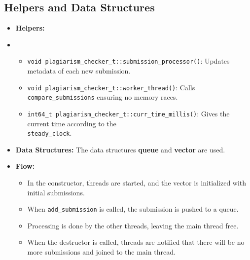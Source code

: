 \documentclass[11pt]{article}
\let\oldtexttt\texttt
\def\texttt#1{{\color{RoyalBlue}\oldtexttt{#1}}}
\begin{document}
\subsection{Helpers and Data Structures}
\begin{itemize}[noitemsep]
    \item \textbf{Helpers:}
    \item \begin{itemize}
        \item \texttt{void plagiarism\_checker\_t::submission\_processor()}:
        Updates metadata of each new submission.
        \item \texttt{void plagiarism\_checker\_t::worker\_thread()}:
        Calls \texttt{compare\_submissions} ensuring no memory races.
        \item \texttt{int64\_t plagiarism\_checker\_t::curr\_time\_millis()}:
        Gives the current time according to the \\ \texttt{steady\_clock}.
    \end{itemize}
    \item \textbf{Data Structures:} The data structures \textbf{queue} and \textbf{vector} are used.
    \item \textbf{Flow:} 
    \begin{itemize}
        \item In the constructor, threads are started, and the vector is initialized with initial submissions.
        \item When \texttt{add\_submission} is called, the submission is pushed to a queue.
        \item Processing is done by the other threads, leaving the main thread free.
        \item When the destructor is called, threads are notified that there will be no more submissions and joined to the main thread.
    \end{itemize}
\end{itemize}
\end{document}
